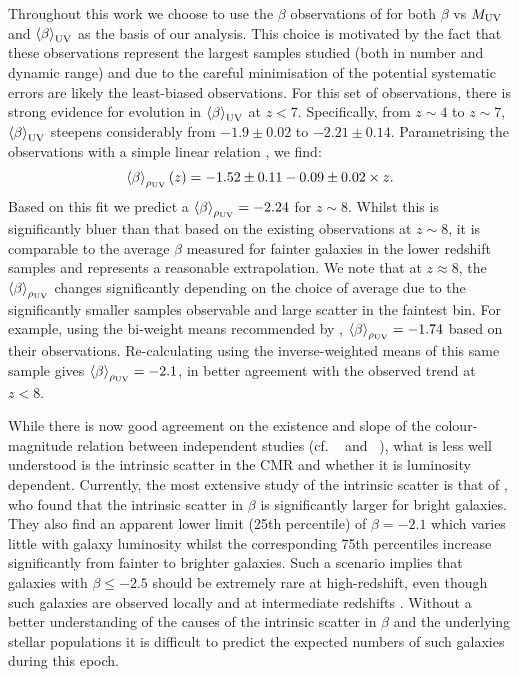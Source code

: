 Throughout this work we choose to use the $\beta$ observations of \citet{Bouwens:2013vf} for both $\beta$ vs $M_{\rm{UV}}$ and $\left \langle \beta  \right \rangle_{\rm{UV}}$ as the basis of our analysis. This choice is motivated by the fact that these observations represent the largest samples studied (both in number and dynamic range) and due to the careful minimisation of the potential systematic errors are likely the least-biased observations. For this set of observations, there is strong evidence for evolution in $\left \langle \beta  \right \rangle_{\rm{UV}}$ at $z < 7$. Specifically, from $z\sim4$ to $z\sim7$, $\left \langle \beta  \right \rangle_{\rm{UV}}$ steepens considerably from  $-1.9\pm0.02$  to $-2.21\pm0.14$. Parametrising the \citet{Bouwens:2013vf} observations with a simple linear relation , we find:
\begin{equation}\label{eq:beta_muv_fit}
    \left \langle \beta \right \rangle_{\rho_{\rm{UV}}}(z) = -1.52 \pm 0.11 - 0.09 \pm 0.02\times z.
\end{equation}
Based on this fit we predict a $\left \langle \beta \right \rangle_{\rho_{\rm{UV}}} = -2.24$ for $z\sim8$. Whilst this is significantly bluer than that based on the existing observations at $z\sim8$, it is comparable to the average $\beta$ measured for fainter galaxies in the lower redshift samples and represents a reasonable extrapolation. We note that at $z\approx 8$, the $\left \langle \beta \right \rangle_{\rho_{\rm{UV}}}$ changes significantly depending on the choice of average due to the significantly smaller samples observable and large scatter in the faintest bin. For example, using the bi-weight means recommended by \citet{Bouwens:2013vf}, $\left \langle \beta \right \rangle_{\rho_{\rm{UV}}} = -1.74$ based on their observations. Re-calculating using the inverse-weighted means of this same sample gives $\left \langle \beta  \right \rangle_{\rho_{\rm{UV}}} = -2.1$, in better agreement with the observed trend at $z < 8$. 

While there is now good agreement on the existence and slope of the colour-magnitude relation between independent studies (cf.  \citeauthor{Bouwens:2013vf}~\citeyear{Bouwens:2013vf} and \citeauthor{Rogers:2014bn}~\citeyear{Rogers:2014bn}), what is less well understood is the intrinsic scatter in the CMR and whether it is luminosity dependent. Currently, the most extensive study of the intrinsic scatter is that of \citet{Rogers:2014bn}, who found that the intrinsic scatter in $\beta$ is significantly larger for bright galaxies. They also find an apparent lower limit (25th percentile) of $\beta = -2.1$ which varies little with galaxy luminosity whilst the corresponding 75th percentiles increase significantly from fainter to brighter galaxies. Such a scenario implies that galaxies with $\beta \leq -2.5$ should be extremely rare at high-redshift, even though such galaxies are observed locally and at intermediate redshifts \citep{Stark:2014fa}. Without a better understanding of the causes of the intrinsic scatter in $\beta$ and the underlying stellar populations it is difficult to predict the expected numbers of such galaxies during this epoch.

